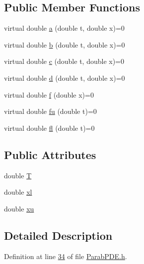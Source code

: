 \subsection*{Public Member Functions}
\begin{DoxyCompactItemize}
\item 
virtual double \hyperlink{classParabPDE_a809e251d53ff62714bc8a30e45cc88a5}{a} (double t, double x)=0
\item 
virtual double \hyperlink{classParabPDE_ab98c81bf66471fa6f67dc17b9123bda6}{b} (double t, double x)=0
\item 
virtual double \hyperlink{classParabPDE_aebec9339309e456136ecd0c3b4a74bb0}{c} (double t, double x)=0
\item 
virtual double \hyperlink{classParabPDE_a13531e677a97660f56f88fc8a9f2c593}{d} (double t, double x)=0
\item 
virtual double \hyperlink{classParabPDE_a099b6ba266fb033de9901a60dc935ddf}{f} (double x)=0
\item 
virtual double \hyperlink{classParabPDE_a8a1850597550bf8aab3b5dca2aed6ff8}{fu} (double t)=0
\item 
virtual double \hyperlink{classParabPDE_aa083d2745f44daba57ad296749eb7ec0}{fl} (double t)=0
\end{DoxyCompactItemize}
\subsection*{Public Attributes}
\begin{DoxyCompactItemize}
\item 
double \hyperlink{classParabPDE_accce3d4cc39e47137915a47b4edd838e}{T}
\item 
double \hyperlink{classParabPDE_aa75c941c87400c92781c74e1e4f5ae5e}{xl}
\item 
double \hyperlink{classParabPDE_a5e4f6911cba231072c0ed4b6b4462b8a}{xu}
\end{DoxyCompactItemize}


\subsection{Detailed Description}


Definition at line \hyperlink{ParabPDE_8h_source_l00034}{34} of file \hyperlink{ParabPDE_8h_source}{Parab\+P\+D\+E.\+h}.



